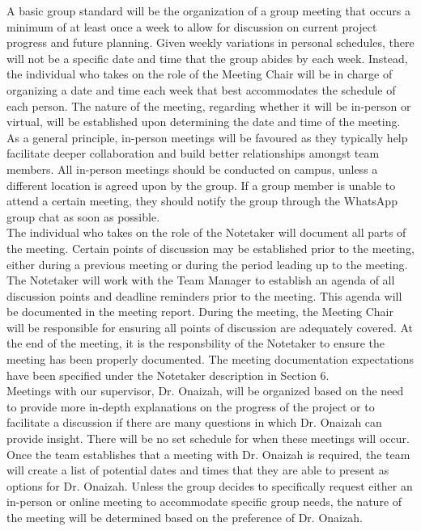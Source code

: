 \documentclass{article}
\begin{document}
\fi

A basic group standard will be the organization of a group meeting that occurs a minimum of at least once a week to
allow for discussion on current project progress and future planning. Given weekly variations in personal schedules, there
will not be a specific date and time that the group abides by each week. Instead, the individual who takes on the
role of the Meeting Chair will be in charge of organizing a date and time each week that best accommodates the
schedule of each person. The nature of the meeting, regarding whether it will be in-person or virtual, will be
established upon determining the date and time of the meeting. As a general principle, in-person meetings will be
favoured as they typically help facilitate deeper collaboration and build better relationships amongst team
members. All in-person meetings should be conducted on campus, unless a different location is agreed upon by the
group. If a group member is unable to attend a certain meeting, they should notify the group through the WhatsApp
group chat as soon as possible.\\

The individual who takes on the role of the Notetaker will document all parts of the meeting. Certain points of
discussion may be established prior to the meeting, either during a previous meeting or during the period leading
up to the meeting. The Notetaker will work with the Team Manager to establish an agenda of all discussion points
and deadline reminders prior to the meeting. This agenda will be documented in the meeting report. During the
meeting, the Meeting Chair will be responsible for ensuring all points of discussion are adequately covered. At the
end of the meeting, it is the responsbility of the Notetaker to ensure the meeting has been properly documented.
The meeting documentation expectations have been specified under the Notetaker description in Section 6.\\

Meetings with our supervisor, Dr. Onaizah, will be organized based on the need to provide more in-depth explanations
on the progress of the project or to facilitate a discussion if there are many questions in which Dr. Onaizah can
provide insight. There will be no set schedule for when these meetings will occur. Once the team establishes that a
meeting with Dr. Onaizah is required, the team will create a list of potential dates and times that they are able
to present as options for Dr. Onaizah. Unless the group decides to specifically request either an in-person or
online meeting to accommodate specific group needs, the nature of the meeting will be determined based on the
preference of Dr. Onaizah.
\end{document}
